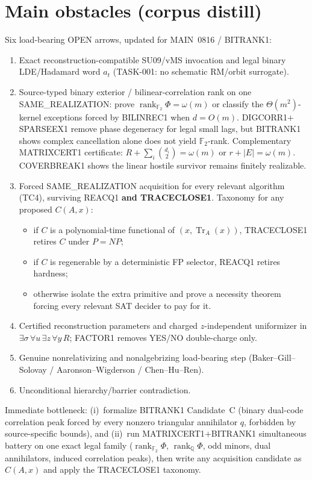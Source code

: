 \documentclass[11pt]{article}
\begin{document}
\section*{Main obstacles (corpus distill)}
Six load-bearing OPEN arrows, updated for MAIN~0816 / BITRANK1:
\begin{enumerate}
\item Exact reconstruction-compatible SU09/vMS invocation and legal binary LDE/Hadamard
word $a_t$ (TASK-001: no schematic RM/orbit surrogate).
\item Source-typed binary exterior / bilinear-correlation rank on one SAME\_REALIZATION:
prove $\operatorname{rank}_{\mathbb F_2}\Phi=\omega(m)$ or classify the $\Theta(m^2)$-kernel
exceptions forced by BILINREC1 when $d=O(m)$. DIGCORR1$+$SPARSEEX1 remove phase
degeneracy for legal small lags, but BITRANK1 shows complex cancellation alone does
not yield $\mathbb F_2$-rank. Complementary MATRIXCERT1 certificate:
$R+\sum_i\binom{d_i}{2}=\omega(m)$ or $r+|E|=\omega(m)$. COVERBREAK1 shows the linear
hostile survivor remains finitely realizable.
\item Forced SAME\_REALIZATION acquisition for every relevant algorithm (TC4), surviving
REACQ1 \textbf{and TRACECLOSE1}. Taxonomy for any proposed $C(A,x)$:
\begin{itemize}
\item if $C$ is a polynomial-time functional of $(x,\operatorname{Tr}_A(x))$, TRACECLOSE1
retires $C$ under $P=NP$;
\item if $C$ is regenerable by a deterministic FP selector, REACQ1 retires hardness;
\item otherwise isolate the extra primitive and prove a necessity theorem forcing every
relevant SAT decider to pay for it.
\end{itemize}
\item Certified reconstruction parameters and charged $z$-independent uniformizer in
$\exists\sigma\,\forall u\,\exists z\,\forall y\,R$; FACTOR1 removes YES/NO double-charge only.
\item Genuine nonrelativizing and nonalgebrizing load-bearing step
(Baker--Gill--Solovay / Aaronson--Wigderson / Chen--Hu--Ren).
\item Unconditional hierarchy/barrier contradiction.
\end{enumerate}
Immediate bottleneck: (i)~formalize BITRANK1 Candidate~C (binary dual-code correlation
peak forced by every nonzero triangular annihilator $q$, forbidden by source-specific
bounds), and (ii)~run MATRIXCERT1$+$BITRANK1 simultaneous battery on one exact legal
family ($\operatorname{rank}_{\mathbb F_2}\Phi$, $\operatorname{rank}_{\mathbb Q}\Phi$,
odd minors, dual annihilators, induced correlation peaks), then write any acquisition
candidate as $C(A,x)$ and apply the TRACECLOSE1 taxonomy.
\end{document}

